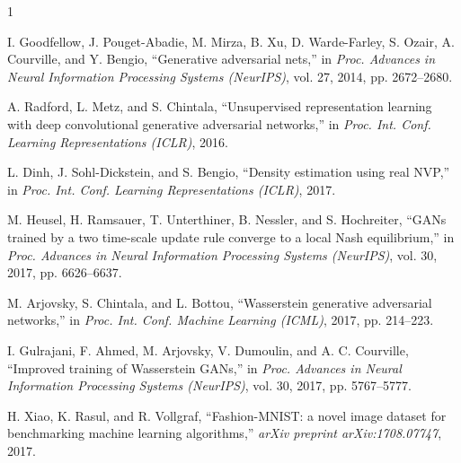 \documentclass[conference,12pt]{IEEEtran}
\begin{document}
\begin{thebibliography}{1}

I. Goodfellow, J. Pouget-Abadie, M. Mirza, B. Xu, D. Warde-Farley, S. Ozair, A. Courville, and Y. Bengio, ``Generative adversarial nets,'' in \textit{Proc. Advances in Neural Information Processing Systems (NeurIPS)}, vol. 27, 2014, pp. 2672--2680.

A. Radford, L. Metz, and S. Chintala, ``Unsupervised representation learning with deep convolutional generative adversarial networks,'' in \textit{Proc. Int. Conf. Learning Representations (ICLR)}, 2016.

L. Dinh, J. Sohl-Dickstein, and S. Bengio, ``Density estimation using real NVP,'' in \textit{Proc. Int. Conf. Learning Representations (ICLR)}, 2017.

M. Heusel, H. Ramsauer, T. Unterthiner, B. Nessler, and S. Hochreiter, ``GANs trained by a two time-scale update rule converge to a local Nash equilibrium,'' in \textit{Proc. Advances in Neural Information Processing Systems (NeurIPS)}, vol. 30, 2017, pp. 6626--6637.

M. Arjovsky, S. Chintala, and L. Bottou, ``Wasserstein generative adversarial networks,'' in \textit{Proc. Int. Conf. Machine Learning (ICML)}, 2017, pp. 214--223.

I. Gulrajani, F. Ahmed, M. Arjovsky, V. Dumoulin, and A. C. Courville, ``Improved training of Wasserstein GANs,'' in \textit{Proc. Advances in Neural Information Processing Systems (NeurIPS)}, vol. 30, 2017, pp. 5767--5777.

H. Xiao, K. Rasul, and R. Vollgraf, ``Fashion-MNIST: a novel image dataset for benchmarking machine learning algorithms,'' \textit{arXiv preprint arXiv:1708.07747}, 2017.

\end{thebibliography}
\end{document}
